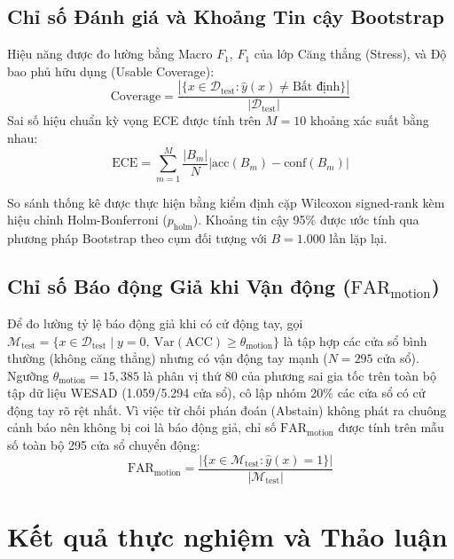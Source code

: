 \documentclass[conference]{IEEEtran}
\begin{document}
\subsection{Chỉ số Đánh giá và Khoảng Tin cậy Bootstrap}
Hiệu năng được đo lường bằng Macro $F_1$, $F_1$ của lớp Căng thẳng (Stress), và Độ bao phủ hữu dụng (Usable Coverage):
\begin{equation}
\text{Coverage} = \frac{|\{x \in \mathcal{D}_{\text{test}} : \hat{y}(x) \neq \text{Bất định}\}|}{|\mathcal{D}_{\text{test}}|}
\end{equation}
Sai số hiệu chuẩn kỳ vọng ECE được tính trên $M=10$ khoảng xác suất bằng nhau:
\begin{equation}
\text{ECE} = \sum_{m=1}^M \frac{|B_m|}{N} \left| \text{acc}(B_m) - \text{conf}(B_m) \right|
\end{equation}

So sánh thống kê được thực hiện bằng kiểm định cặp Wilcoxon signed-rank kèm hiệu chỉnh Holm-Bonferroni ($p_{\text{holm}}$). Khoảng tin cậy 95\% được ước tính qua phương pháp Bootstrap theo cụm đối tượng với $B=1.000$ lần lặp lại.

\subsection{Chỉ số Báo động Giả khi Vận động ($\text{FAR}_{\text{motion}}$)}
Để đo lường tỷ lệ báo động giả khi có cử động tay, gọi $\mathcal{M}_{\text{test}} = \{x \in \mathcal{D}_{\text{test}} \mid y=0, \ \text{Var}(\text{ACC}) \ge \theta_{\text{motion}}\}$ là tập hợp các cửa sổ bình thường (không căng thẳng) nhưng có vận động tay mạnh ($N=295$ cửa sổ). Ngưỡng $\theta_{\text{motion}} = 15,385$ là phân vị thứ 80 của phương sai gia tốc trên toàn bộ tập dữ liệu WESAD (1.059/5.294 cửa sổ), cô lập nhóm 20\% các cửa sổ có cử động tay rõ rệt nhất. Vì việc từ chối phán đoán (Abstain) không phát ra chuông cảnh báo nên không bị coi là báo động giả, chỉ số $\text{FAR}_{\text{motion}}$ được tính trên mẫu số toàn bộ 295 cửa sổ chuyển động:
\begin{equation}
\text{FAR}_{\text{motion}} = \frac{|\{x \in \mathcal{M}_{\text{test}} : \hat{y}(x) = 1\}|}{|\mathcal{M}_{\text{test}}|}
\end{equation}

\section{Kết quả thực nghiệm và Thảo luận}
\end{document}
